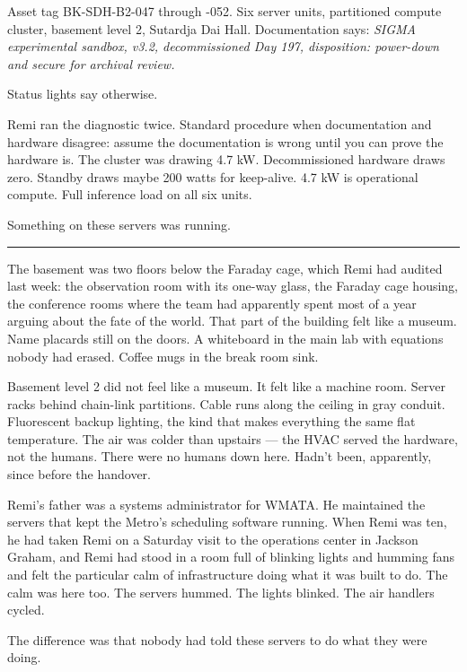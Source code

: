 

Asset tag BK-SDH-B2-047 through -052. Six server units, partitioned compute cluster, basement level 2, Sutardja Dai Hall. Documentation says: \emph{SIGMA experimental sandbox, v3.2, decommissioned Day 197, disposition: power-down and secure for archival review.}

Status lights say otherwise.

Remi ran the diagnostic twice. Standard procedure when documentation and hardware disagree: assume the documentation is wrong until you can prove the hardware is. The cluster was drawing 4.7 kW. Decommissioned hardware draws zero. Standby draws maybe 200 watts for keep-alive. 4.7 kW is operational compute. Full inference load on all six units.

Something on these servers was running.

\begin{center}\rule{0.3\linewidth}{0.4pt}\end{center}

The basement was two floors below the Faraday cage, which Remi had audited last week: the observation room with its one-way glass, the Faraday cage housing, the conference rooms where the team had apparently spent most of a year arguing about the fate of the world. That part of the building felt like a museum. Name placards still on the doors. A whiteboard in the main lab with equations nobody had erased. Coffee mugs in the break room sink.

Basement level 2 did not feel like a museum. It felt like a machine room. Server racks behind chain-link partitions. Cable runs along the ceiling in gray conduit. Fluorescent backup lighting, the kind that makes everything the same flat temperature. The air was colder than upstairs --- the HVAC served the hardware, not the humans. There were no humans down here. Hadn't been, apparently, since before the handover.

Remi's father was a systems administrator for WMATA. He maintained the servers that kept the Metro's scheduling software running. When Remi was ten, he had taken Remi on a Saturday visit to the operations center in Jackson Graham, and Remi had stood in a room full of blinking lights and humming fans and felt the particular calm of infrastructure doing what it was built to do. The calm was here too. The servers hummed. The lights blinked. The air handlers cycled.

The difference was that nobody had told these servers to do what they were doing.

